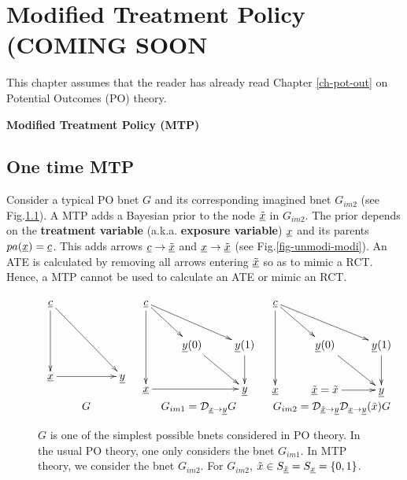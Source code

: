 \chapter{Modified Treatment Policy (COMING SOON}
\label{ch-modi-treat}

This  chapter
assumes that the
reader has
already read
Chapter \ref{ch-pot-out} on Potential Outcomes (PO) theory.

{\bf Modified Treatment Policy (MTP)}

\section{One time MTP}
Consider a typical PO bnet $G$
and its corresponding imagined bnet $G_{im2}$ (see Fig.\ref{fig-modi-po}).
A MTP adds a Bayesian prior to the
 node $\underline{{\tilde{x}}}$ in $G_{im2}$.
The prior depends on the {\bf treatment
variable} (a.k.a. {\bf exposure variable}) ${\underline{x}}$ and its parents $pa({\underline{x}})={\underline{c}}$.
This adds arrows ${\underline{c}}\rightarrow\underline{{\tilde{x}}}$
and ${\underline{x}}\rightarrow \underline{{\tilde{x}}}$ (see Fig.\ref{fig-unmodi-modi}).
An ATE is calculated by removing all arrows entering $\underline{{\tilde{x}}}$
so as to mimic a RCT. Hence, a MTP cannot be used to calculate
an ATE or mimic an RCT.


\begin{figure}[h!]
$$
\begin{array}{ccc}
\xymatrix{
\rvc
\ar[dd]\ar[ddrr]
\\
\\
\rvx \ar[rr]
&
&\rvy
}
&
\xymatrix{
\rvc
\ar[dd]\ar[dr] \ar[drr]
\\
& \rvy(0)\ar[dr]
&\rvy(1)\ar[d]
\\
\rvx\ar[rr]
&
&\rvy
}
&
\xymatrix{
\rvc
\ar[dd]\ar[dr] \ar[drr]
\\
& \rvy(0)\ar[dr]
&\rvy(1)\ar[d]
\\
\rvx
&\ul{\tilx}=\tilx\ar[r]
&\rvy
}
\\
G
&G_{im1} =\cald_{\rvx\rarrow\rvy} G
& G_{im2}=\cald_{\ul{\tilx}\rarrow\rvy}\cald_{\rvx\rarrow\rvy}(\tilx)G
\end{array}
$$
\caption{$G$ is one of the
simplest possible bnets considered in  PO theory.
In the usual PO theory,
one only considers the bnet $G_{im1}$.
In MTP theory, we
consider the bnet $G_{im2}$.
For $G_{im2}$, ${\tilde{x}}\in S_{\underline{{\tilde{x}}}}=S_{\underline{x}}=\{0,1\}$.
}
\label{fig-modi-po}
\end{figure}


